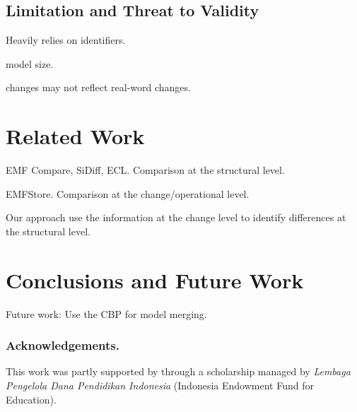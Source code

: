 \documentclass{llncs}
\begin{document}
\subsection{Limitation and Threat to Validity}
\label{sec:limitation_and_Threat_to_validity}

Heavily relies on identifiers.

model size.

changes may not reflect real-word changes.



\section{Related Work}
\label{sec:related_work}

EMF Compare, SiDiff, ECL. Comparison at the structural level. 

EMFStore. Comparison at the change/operational level. 

Our approach use the information at the change level to identify differences at the structural level.


\section{Conclusions and Future Work}
\label{sec:conclusion_and_future_work}

Future work: Use the CBP for model merging.

\vspace{-10pt}
\subsubsection*{Acknowledgements.} This work was partly supported by through a scholarship managed by \emph{Lembaga Pengelola Dana Pendidikan Indonesia} (Indonesia Endowment Fund for Education).

 

\end{document}
